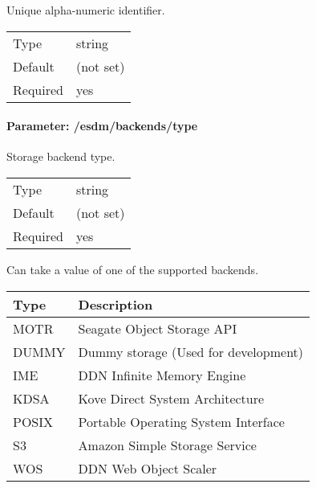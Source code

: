 Unique alpha-numeric identifier.

\begin{preserve}
 \noindent
 \begin{tabular}{ll}
   Type     & string    \\ 
   Default  & (not set) \\ 
   Required & yes       \\ 
 \end{tabular} 
\end{preserve}
\FloatBarrier
\vspace{\gapsize}


\paragraph{Parameter: /esdm/backends/type}
Storage backend type. 

\begin{preserve}
  \noindent
  \begin{tabular}{ll}
    Type     & string    \\ 
    Default  & (not set) \\ 
    Required & yes       \\ 
  \end{tabular}
\end{preserve}

Can take a value of one of the supported backends.

\begin{preserve}
  \noindent
  \begin{center}
    \begin{tabular}{ll}
      Type   & Description                          \\ 
      \hline
      MOTR   & Seagate Object Storage API           \\ 
      DUMMY  & Dummy storage (Used for development) \\ 
      IME    & DDN Infinite Memory Engine           \\ 
      KDSA   & Kove Direct System Architecture      \\ 
      POSIX  & Portable Operating System Interface  \\ 
      S3     & Amazon Simple Storage Service        \\ 
      WOS    & DDN Web Object Scaler                \\ 
    \end{tabular}
  \end{center}
\end{preserve}
\FloatBarrier
\vspace{\gapsize}


